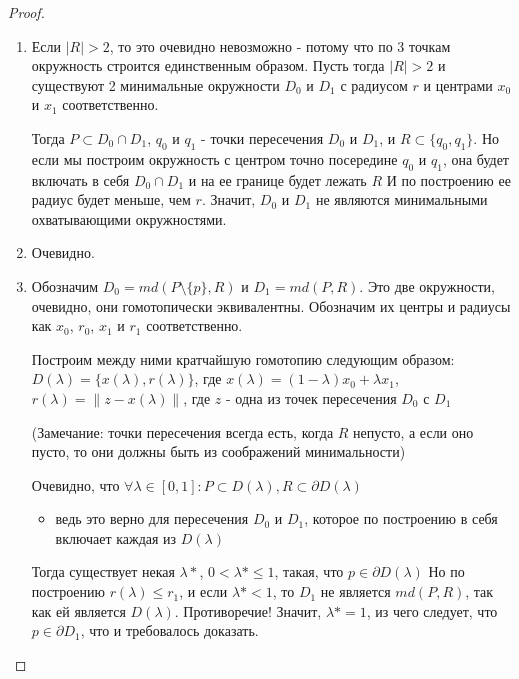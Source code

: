 \documentclass[11pt]{article}
\begin{document}
\begin{proof}
\begin{enumerate}
\item Если \(|R| > 2\), то это очевидно невозможно - потому что по 3 точкам окружность строится единственным образом.
Пусть тогда \(|R| > 2\) и существуют 2 минимальные окружности \(D_0\) и \(D_1\) с радиусом \(r\) и центрами \(x_0\) и \(x_1\) соответственно.

Тогда \(P \subset D_0 \cap D_1\), \(q_0\) и \(q_1\) - точки пересечения \(D_0\) и \(D_1\), и \(R \subset \{q_0, q_1\}\).
Но если мы построим окружность с центром точно посередине \(q_0\) и \(q_1\), она будет включать в себя \(D_0 \cap D_1\) и на
ее границе будет лежать \(R\) И по построению ее радиус будет меньше, чем \(r\). Значит, \(D_0\) и \(D_1\) не являются
минимальными охватывающими окружностями.

\item Очевидно.

\item Обозначим \(D_0 = md(P \setminus \{p\}, R)\) и \(D_1 = md(P, R)\). Это две окружности, очевидно, они гомотопически эквивалентны.
Обозначим их центры и радиусы как \(x_0\), \(r_0\), \(x_1\) и \(r_1\) соответственно.

Построим между ними кратчайшую гомотопию следующим образом:
\(D(\lambda) = \{x(\lambda), r(\lambda)\}\), где
\(x(\lambda) = (1 - \lambda)x_0 + \lambda x_1\),
\(r(\lambda) = \|z - x(\lambda)\|\), где \(z\) - одна из точек пересечения \(D_0\) с \(D_1\)

(Замечание: точки пересечения всегда есть, когда \(R\) непусто, а если оно пусто, то они должны быть из
соображений минимальности)

Очевидно, что \(\forall \lambda \in [0, 1] : P \subset D(\lambda), R \subset \partial D(\lambda)\)
\begin{itemize}
\item ведь это верно для пересечения \(D_0\) и \(D_1\), которое по построению в себя включает каждая из \(D(\lambda)\)
\end{itemize}
Тогда существует некая \(\lambda*\), \(0 < \lambda* \leqslant 1\), такая, что \(p \in \partial D(\lambda)\)
Но по построению \(r(\lambda) \leqslant r_1\), и если \(\lambda* < 1\), то \(D_1\) не является \(md(P, R)\),
так как ей является \(D(\lambda)\). Противоречие! Значит, \(\lambda* = 1\), из чего следует,
что \(p \in \partial D_1\), что и требовалось доказать.
\end{enumerate}
\end{proof}
\end{document}
